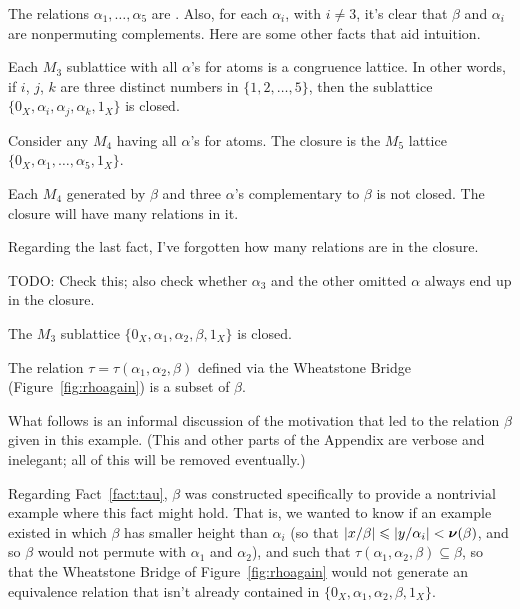 The relations $\alpha_1, \dots, \alpha_5$ are \pppc.  Also, for 
each $\alpha_i$, with $i\neq 3$, it's clear that $\beta$ and $\alpha_i$ are
nonpermuting complements.
Here are some other facts that aid intuition.
\begin{fact}
  Each $M_3$ sublattice with all $\alpha$'s for atoms is a congruence lattice.  In
  other words, if $i$, $j$, $k$ are three distinct numbers in $\{1,2,\dots, 5\}$, then the sublattice $\{0_X, \alpha_i, \alpha_j,
  \alpha_k, 1_X\}$ is closed. 
\end{fact}
\begin{fact}
Consider any $M_4$ having all $\alpha$'s for atoms.  The closure is the $M_5$
lattice $\{0_X, \alpha_1, \dots, \alpha_5, 1_X\}$.
\end{fact}
\begin{fact}
  Each $M_4$ generated by $\beta$ and three $\alpha$'s complementary to
  $\beta$ is not closed.  The closure will have many relations in it.
\end{fact}
Regarding the last fact, I've forgotten how many relations are in the closure.

TODO: Check this; also check whether $\alpha_3$ and the other omitted $\alpha$
  always end up in the closure.
\begin{fact}
  The $M_3$ sublattice $\{0_X, \alpha_1, \alpha_2, \beta, 1_X\}$ is closed.
\end{fact}
  \begin{fact}
\label{fact:tau}
  The relation $\tau = \tau(\alpha_1, \alpha_2, \beta)$ defined via the
  Wheatstone Bridge (Figure~\ref{fig:rhoagain}) is a subset of $\beta$.
  \end{fact}

What follows is an informal discussion of the motivation that led to the
relation $\beta$ given in this example.  (This and other parts of
the Appendix are verbose and inelegant; all of this will be removed
eventually.) 

Regarding Fact~\ref{fact:tau}, $\beta$ was constructed specifically to provide a
nontrivial example where this fact might hold.  That is, we wanted to know if
an example existed in which $\beta$ has smaller height than $\alpha_i$ (so that 
$|x/\beta| \leqslant |y/\alpha_i| < \operatorname{\boldsymbol{\nu}}(\beta)$, and so $\beta$ would not permute
with $\alpha_1$ and $\alpha_2$), and such that 
$\tau(\alpha_1, \alpha_2, \beta)\subseteq \beta$, so that the Wheatstone
Bridge of Figure~\ref{fig:rhoagain} would not generate an equivalence
relation that isn't already contained in 
$\{0_X, \alpha_1, \alpha_2, \beta, 1_X\}$.


